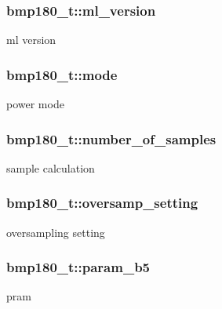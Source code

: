 \subsubsection[{\texorpdfstring{ml\+\_\+version}{ml_version}}]{ bmp180\+\_\+t\+::ml\+\_\+version}\hypertarget{structbmp180__t_a369cb61fc9c7de06061f13eb8be5aa34}{}\label{structbmp180__t_a369cb61fc9c7de06061f13eb8be5aa34}
ml version 
\subsubsection[{\texorpdfstring{mode}{mode}}]{ bmp180\+\_\+t\+::mode}\hypertarget{structbmp180__t_ac5514a7ce3e3d23f7a6722711039edba}{}\label{structbmp180__t_ac5514a7ce3e3d23f7a6722711039edba}
power mode 
\subsubsection[{\texorpdfstring{number\+\_\+of\+\_\+samples}{number_of_samples}}]{ bmp180\+\_\+t\+::number\+\_\+of\+\_\+samples}\hypertarget{structbmp180__t_a919c92f3b67c115eb7546855d3322f8f}{}\label{structbmp180__t_a919c92f3b67c115eb7546855d3322f8f}
sample calculation 
\subsubsection[{\texorpdfstring{oversamp\+\_\+setting}{oversamp_setting}}]{ bmp180\+\_\+t\+::oversamp\+\_\+setting}\hypertarget{structbmp180__t_a6ade944cf9275b333add5785f33701bd}{}\label{structbmp180__t_a6ade944cf9275b333add5785f33701bd}
oversampling setting 
\subsubsection[{\texorpdfstring{param\+\_\+b5}{param_b5}}]{ bmp180\+\_\+t\+::param\+\_\+b5}\hypertarget{structbmp180__t_ae753cf9c8d8f28a1b3395c472acb61fb}{}\label{structbmp180__t_ae753cf9c8d8f28a1b3395c472acb61fb}
pram 
